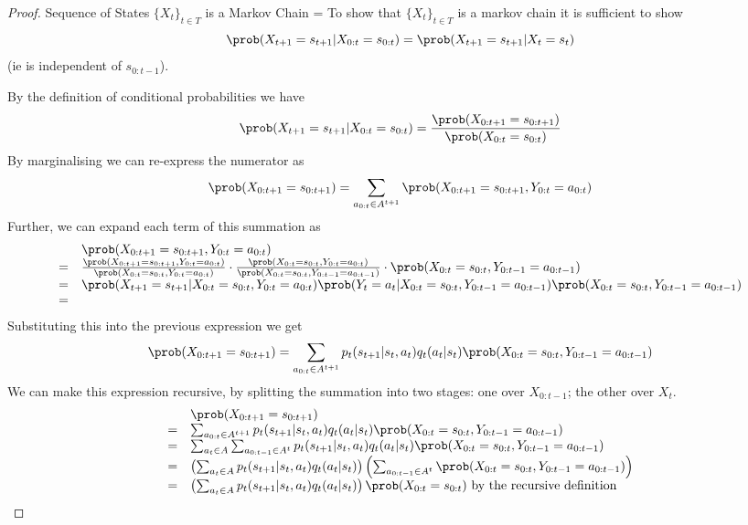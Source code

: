 \documentclass[11pt,a4paper]{article}
\begin{document}
  \begin{proof}{Sequence of States $\{X_t\}_{t\in T}$ is a Markov Chain}
    \everymath={\displaystyle}
    To show that $\{X_t\}_{t\in T}$ is a markov chain it is sufficient to show
    \[ \prob(X_{t+1}=s_{t+1}|X_{0:t}=s_{0:t})=\prob(X_{t+1}=s_{t+1}|X_t=s_t) \]
    (ie is independent of $s_{0:t-1}$).
    \par By the definition of conditional probabilities we have
    \[ \prob(X_{t+1}=s_{t+1}|X_{0:t}=s_{0:t})=\frac{\prob(X_{0:t+1}=s_{0:t+1})}{\prob(X_{0:t}=s_{0:t})} \]
    By marginalising we can re-express the numerator as
    \[ \prob(X_{0:t+1}=s_{0:t+1})=\sum_{a_{0:t}\in A^{t+1}}\prob(X_{0:t+1}=s_{0:t+1},Y_{0:t}=a_{0:t}) \]
    Further, we can expand each term of this summation as
    \[\begin{array}{rl}
      &\prob(X_{0:t+1}=s_{0:t+1},Y_{0:t}=a_{0:t})\\
      =&\frac{\prob(X_{0:t+1}=s_{0:t+1},Y_{0:t}=a_{0:t})}{\prob(X_{0:t}=s_{0:t},Y_{0:t}=a_{0:t})}\cdot\frac{\prob(X_{0:t}=s_{0:t},Y_{0:t}=a_{0:t})}{\prob(X_{0:t}=s_{0:t},Y_{0:t-1}=a_{0:t-1})}\cdot\prob(X_{0:t}=s_{0:t},Y_{0:t-1}=a_{0:t-1})\\
      =&\prob(X_{t+1}=s_{t+1}|X_{0:t}=s_{0:t},Y_{0:t}=a_{0:t})\prob(Y_t=a_t|X_{0:t}=s_{0:t},Y_{0:t-1}=a_{0:t-1})\prob(X_{0:t}=s_{0:t},Y_{0:t-1}=a_{0:t-1})\\
      =&
    \end{array}\]
    Substituting this into the previous expression we get
    \[ \prob(X_{0:t+1}=s_{0:t+1})=\sum_{a_{0:t}\in A^{t+1}}p_t(s_{t+1}|s_t,a_t)q_t(a_t|s_t)\prob(X_{0:t}=s_{0:t},Y_{0:t-1}=a_{0:t-1}) \]
    We can make this expression recursive, by splitting the summation into two stages: one over $X_{0:t-1}$; the other over $X_t$.
    \[\begin{array}{rl}
      &\prob(X_{0:t+1}=s_{0:t+1})\\
      =&\sum_{a_{0:t}\in A^{t+1}}p_t(s_{t+1}|s_t,a_t)q_t(a_t|s_t)\prob(X_{0:t}=s_{0:t},Y_{0:t-1}=a_{0:t-1})\\
      =&\sum_{a_t\in A}\sum_{a_{0:t-1}\in A^t}p_t(s_{t+1}|s_t,a_t)q_t(a_t|s_t)\prob(X_{0:t}=s_{0:t},Y_{0:t-1}=a_{0:t-1})\\
      =&\left(\sum_{a_t\in A}p_t(s_{t+1}|s_t,a_t)q_t(a_t|s_t)\right)\left(\sum_{a_{0:t-1}\in A^t}\prob(X_{0:t}=s_{0:t},Y_{0:t-1}=a_{0:t-1})\right)\\
      =&\left(\sum_{a_t\in A}p_t(s_{t+1}|s_t,a_t)q_t(a_t|s_t)\right)\prob(X_{0:t}=s_{0:t})\text{ by the recursive definition}
    \end{array}\]

\end{proof}
\end{document}
